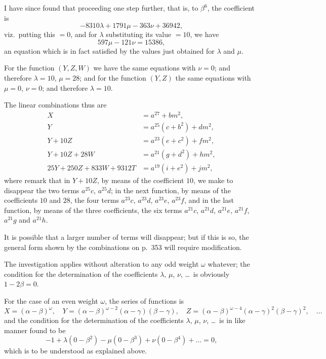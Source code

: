 \documentclass[11pt,a4paper]{book}
\begin{document}
I have since found that proceeding one step further, that is, to $\beta^6$, the coefficient is
\[
-8310\lambda + 1791\mu - 363\nu + 36942,
\]
viz.\ putting this $= 0$, and for $\lambda$ substituting its value $= 10$, we have
\[
597\mu - 121\nu = 15386,
\]
an equation which is in fact satisfied by the values just obtained for $\lambda$ and $\mu$.

For the function $(Y, Z, W)$ we have the same equations with $\nu = 0$; and therefore $\lambda = 10$, $\mu = 28$; and for the function $(Y, Z)$ the same equations with $\mu = 0$, $\nu = 0$; and therefore $\lambda = 10$.

The linear combinations thus are
\begin{align*}
X &= a^{27} + bm^2,\\
Y &= a^{25}(c + b^2) + dm^2,\\
Y + 10Z &= a^{23}(e + c^2) + fm^2,\\
Y + 10Z + 28W &= a^{21}(g + d^2) + hm^2,\\
25Y + 250Z + 833W + 9312T &= a^{19}(i + e^2) + jm^2,
\end{align*}
where remark that in $Y + 10Z$, by means of the coefficient $10$, we make to disappear the two terms $a^{25}c$, $a^{25}d$; in the next function, by means of the coefficients $10$ and $28$, the four terms $a^{23}c$, $a^{23}d$, $a^{23}e$, $a^{23}f$, and in the last function, by means of the three coefficients, the six terms $a^{21}c$, $a^{21}d$, $a^{21}e$, $a^{21}f$, $a^{21}g$ and $a^{21}h$.

It is possible that a larger number of terms will disappear; but if this is so, the general form shown by the combinations on p.~353 will require modification.

The investigation applies without alteration to any odd weight $\omega$ whatever; the condition for the determination of the coefficients $\lambda$, $\mu$, $\nu$, \ldots\ is obviously $1 - 2\beta = 0$.

For the case of an even weight $\omega$, the series of functions is
\[
X = (\alpha - \beta)^{\omega}, \quad Y = (\alpha - \beta)^{\omega-2}(\alpha - \gamma)(\beta - \gamma), \quad Z = (\alpha - \beta)^{\omega-4}(\alpha - \gamma)^2(\beta - \gamma)^2, \quad \ldots
\]
and the condition for the determination of the coefficients $\lambda$, $\mu$, $\nu$, \ldots\ is in like manner found to be
\[
-1 + \lambda(0 - \beta^2) - \mu(0 - \beta^3) + \nu(0 - \beta^4) + \ldots = 0,
\]
which is to be understood as explained above.

\newpage
\end{document}
